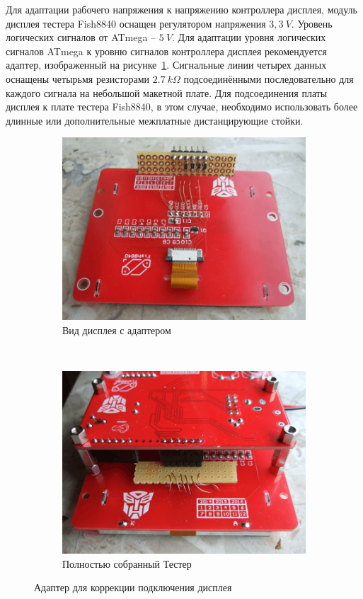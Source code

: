 Для адаптации рабочего напряжения к напряжению контроллера дисплея, модуль дисплея тестера Fish8840 
оснащен регулятором напряжения \(3,3~V\). 
Уровень логических сигналов от ATmega -- \(5~V\). Для адаптации уровня логических
сигналов ATmega к уровню сигналов контроллера дисплея рекомендуется адаптер, изображенный на рисунке~\ref{fig:Fish8840Adapt}.
Сигнальные линии четырех данных оснащены четырьмя резисторами \(2.7~k\Omega\) подсоединёнными последовательно 
для каждого сигнала на небольшой макетной плате. Для подсоединения платы дисплея к плате тестера Fish8840, в 
этом случае, необходимо использовать более длинные или дополнительные межплатные дистанцирующие стойки.
\begin{figure}[H]
  \begin{subfigure}[b]{.5\textwidth}
    \centering
    \includegraphics[width=1.\textwidth]{../PNG/Fish8840Adapt1.jpg}
    \caption{Вид дисплея с адаптером}
  \end{subfigure}
  ~
  \begin{subfigure}[b]{.5\textwidth}
    \centering
    \includegraphics[width=1.\textwidth]{../PNG/Fish8840Adapt2.jpg}
    \caption{Полностью собранный Тестер}
  \end{subfigure}
  \caption{Адаптер для коррекции подключения дисплея}
  \label{fig:Fish8840Adapt}
\end{figure}

